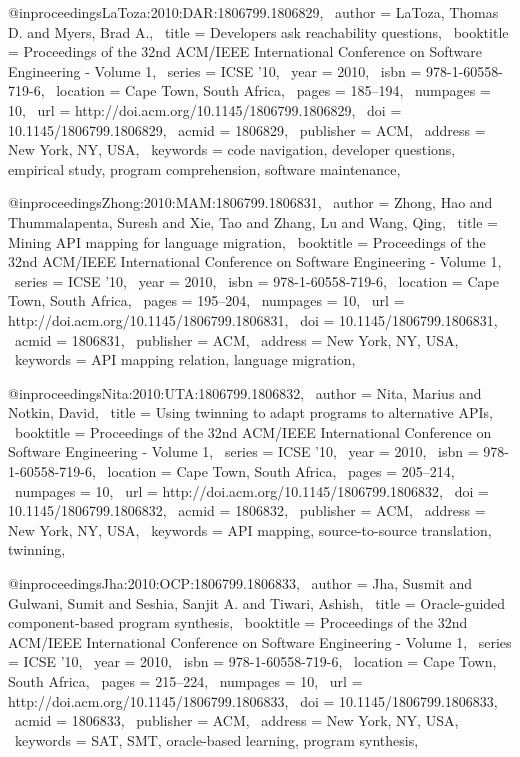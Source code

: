 @inproceedings{LaToza:2010:DAR:1806799.1806829,
 author = {LaToza, Thomas D. and Myers, Brad A.},
 title = {Developers ask reachability questions},
 booktitle = {Proceedings of the 32nd ACM/IEEE International Conference on Software Engineering - Volume 1},
 series = {ICSE '10},
 year = {2010},
 isbn = {978-1-60558-719-6},
 location = {Cape Town, South Africa},
 pages = {185--194},
 numpages = {10},
 url = {http://doi.acm.org/10.1145/1806799.1806829},
 doi = {10.1145/1806799.1806829},
 acmid = {1806829},
 publisher = {ACM},
 address = {New York, NY, USA},
 keywords = {code navigation, developer questions, empirical study, program comprehension, software maintenance},
} 

@inproceedings{Zhong:2010:MAM:1806799.1806831,
 author = {Zhong, Hao and Thummalapenta, Suresh and Xie, Tao and Zhang, Lu and Wang, Qing},
 title = {Mining API mapping for language migration},
 booktitle = {Proceedings of the 32nd ACM/IEEE International Conference on Software Engineering - Volume 1},
 series = {ICSE '10},
 year = {2010},
 isbn = {978-1-60558-719-6},
 location = {Cape Town, South Africa},
 pages = {195--204},
 numpages = {10},
 url = {http://doi.acm.org/10.1145/1806799.1806831},
 doi = {10.1145/1806799.1806831},
 acmid = {1806831},
 publisher = {ACM},
 address = {New York, NY, USA},
 keywords = {API mapping relation, language migration},
} 

@inproceedings{Nita:2010:UTA:1806799.1806832,
 author = {Nita, Marius and Notkin, David},
 title = {Using twinning to adapt programs to alternative APIs},
 booktitle = {Proceedings of the 32nd ACM/IEEE International Conference on Software Engineering - Volume 1},
 series = {ICSE '10},
 year = {2010},
 isbn = {978-1-60558-719-6},
 location = {Cape Town, South Africa},
 pages = {205--214},
 numpages = {10},
 url = {http://doi.acm.org/10.1145/1806799.1806832},
 doi = {10.1145/1806799.1806832},
 acmid = {1806832},
 publisher = {ACM},
 address = {New York, NY, USA},
 keywords = {API mapping, source-to-source translation, twinning},
} 

@inproceedings{Jha:2010:OCP:1806799.1806833,
 author = {Jha, Susmit and Gulwani, Sumit and Seshia, Sanjit A. and Tiwari, Ashish},
 title = {Oracle-guided component-based program synthesis},
 booktitle = {Proceedings of the 32nd ACM/IEEE International Conference on Software Engineering - Volume 1},
 series = {ICSE '10},
 year = {2010},
 isbn = {978-1-60558-719-6},
 location = {Cape Town, South Africa},
 pages = {215--224},
 numpages = {10},
 url = {http://doi.acm.org/10.1145/1806799.1806833},
 doi = {10.1145/1806799.1806833},
 acmid = {1806833},
 publisher = {ACM},
 address = {New York, NY, USA},
 keywords = {SAT, SMT, oracle-based learning, program synthesis},
} 

